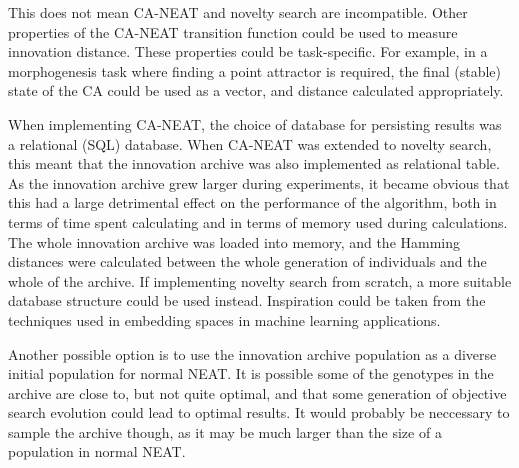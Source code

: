 This does not mean CA-NEAT and novelty search are incompatible.
Other properties of the CA-NEAT transition function could be used to measure innovation distance.
These properties could be task-specific.
For example, in a morphogenesis task where finding a point attractor is required, the final (stable) state of the CA could be used as a vector,
and distance calculated appropriately.

When implementing CA-NEAT, the choice of database for persisting results was a relational (SQL) database.
When CA-NEAT was extended to novelty search, this meant that the innovation archive was also implemented as relational table.
As the innovation archive grew larger during experiments, it became obvious that this had a large detrimental effect on the performance of the algorithm, both in terms of time spent calculating and in terms of memory used during calculations.
The whole innovation archive was loaded into memory,
and the Hamming distances were calculated between the whole generation of individuals and the whole of the archive.
If implementing novelty search from scratch, a more suitable database structure could be used instead.
Inspiration could be taken from the techniques used in embedding spaces in machine learning applications.

Another possible option is to use the innovation archive population as a diverse initial population for normal NEAT.
It is possible some of the genotypes in the archive are close to, but not quite optimal, and that some generation of objective search evolution could lead to optimal results.
It would probably be neccessary to sample the archive though, as it may be much larger than the size of a population in normal NEAT.
